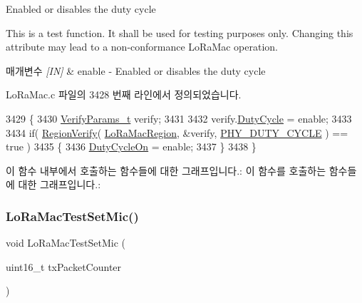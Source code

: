 Enabled or disables the duty cycle 

This is a test function. It shall be used for testing purposes only. Changing this attribute may lead to a non-\/conformance Lo\+Ra\+Mac operation.


\begin{DoxyParams}{매개변수}
{\em \mbox{[}\+I\+N\mbox{]}} & enable -\/ Enabled or disables the duty cycle \\
\hline
\end{DoxyParams}


Lo\+Ra\+Mac.\+c 파일의 3428 번째 라인에서 정의되었습니다.


\begin{DoxyCode}
3429 \{
3430     \mbox{\hyperlink{unionu_verify_params}{VerifyParams\_t}} verify;
3431 
3432     verify.\mbox{\hyperlink{unionu_verify_params_a72f580d8a64ab70f5c4f7e10a694c65b}{DutyCycle}} = enable;
3433 
3434     \textcolor{keywordflow}{if}( \mbox{\hyperlink{group___r_e_g_i_o_n_ga7c1ff626bc1131889fa8de3197a1093a}{RegionVerify}}( \mbox{\hyperlink{_lo_ra_mac_8c_ab3e53bd4a0f4e547c9dbf450406acfe5}{LoRaMacRegion}}, &verify, 
      \mbox{\hyperlink{group___r_e_g_i_o_n_gga51cbe8f5433d914fe9cf81b451de2c2dac66308571e624ecc28c79ee0deab8cf0}{PHY\_DUTY\_CYCLE}} ) == \textcolor{keyword}{true} )
3435     \{
3436         \mbox{\hyperlink{_lo_ra_mac_8c_af662c54719ba22aa5580de1fc74de2dc}{DutyCycleOn}} = enable;
3437     \}
3438 \}
\end{DoxyCode}
이 함수 내부에서 호출하는 함수들에 대한 그래프입니다.\+:
이 함수를 호출하는 함수들에 대한 그래프입니다.\+:
\mbox{\label{group___l_o_r_a_m_a_c_t_e_s_t_ga191314e00a8a27f426427473ba6821a7}} 
\subsubsection{\texorpdfstring{Lo\+Ra\+Mac\+Test\+Set\+Mic()}{LoRaMacTestSetMic()}}
{\footnotesize\ttfamily void Lo\+Ra\+Mac\+Test\+Set\+Mic (\begin{DoxyParamCaption}\item[{uint16\+\_\+t}]{tx\+Packet\+Counter }\end{DoxyParamCaption})}




